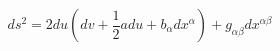 \begin{equation}
\label{localwave}
ds^2 = 2du(dv+\frac{1}{2}adu+b_{\alpha}dx^{\alpha})+g_{\alpha
\beta}dx^{\alpha \beta}
\end{equation}

